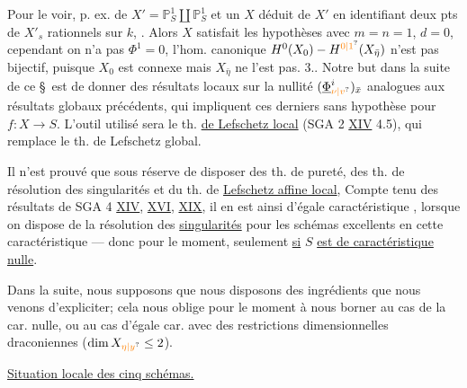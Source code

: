  Pour le voir,  p. ex. de   $X'=\mathbb P^1_S\amalg\mathbb P^1_S$ et  un $X$ déduit de $X'$ en identifiant deux pts  de $X'_s$ rationnels sur $k$, . Alors  $X$ satisfait les hypothèses avec $m=n=1$, $d=0$, cependant  on n'a pas $\Phi^1=0$,   l'hom. canonique $H^0(X_0)\mathbin{-}H^{\unsure{0|1}}(X_{\bar\eta})$ n'est pas bijectif, puisque $X_0$ est connexe mais $X_{\bar\eta}$ ne l'est pas.
3.. Notre but dans la suite de ce \S\ est de donner des résultats locaux sur la nullité  $(\underline\Phi^i_{\unsure{\nu|v}})_{\bar x}$ analogues aux résultats globaux précédents, qui impliquent ces derniers sans hypothèse  pour $f:X\to S$. L'outil utilisé sera le th. \uline{de Lefschetz local} (SGA 2 \uline{XIV} 4.5), qui remplace le th. de Lefschetz global.

Il n'est prouvé que sous réserve de disposer des th. de pureté,  des th. de résolution des singularités et du th. de \uline{Lefschetz affine local},  Compte tenu des résultats de SGA 4 \uline{XIV}, \uline{XVI}, \uline{XIX}, il en est ainsi    d'égale caractéristique , lorsque on dispose de la résolution des \uline{singularités} pour les schémas excellents en cette caractéristique ---  donc pour le moment, seulement \uline{si} $S$ \uline{est de caractéristique nulle}.

Dans la suite, nous supposons que nous disposons des ingrédients que nous venons d'expliciter; cela nous oblige pour le moment à nous borner au cas de la car. nulle, ou au cas d'égale car. avec des restrictions dimensionnelles draconiennes ($\dim X_{\unsure{\eta|y}}\leq2$).

  \uline{Situation locale des cinq schémas.}

